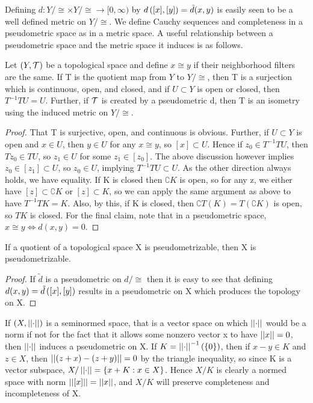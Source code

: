 




 
  Defining $d:Y/\cong \times Y/\cong \to [0,\infty)$ by $d\left( [x],[y]\right) = \tilde{d}(x,y)$ is easily seen to be a well defined metric on $Y/\cong$. We define Cauchy sequences and completeness in a pseudometric space as in a metric space. A useful relationship between a pseudometric space and the metric space it induces is as follows. 
\begin{prop}
    \label{prop:pseudometricembedding}
    Let $(Y,\mathcal{T})$ be a topological space and define $x \cong y$ if their neighborhood filters are the same. If T is the quotient map from $Y$ to $Y/\cong$, then T is a surjection which is continuous, open, and closed, and if $U \subset Y$ is open or closed, then $T^{-1} T U = U$. 
    Further, if $\mathcal{T}$ is created by a pseudometric d, then T is an isometry using the induced metric on $Y/\cong$.
    \begin{proof}
        That T is surjective, open, and continuous is obvious. Further, if $U \subset Y$ is open and $x \in U$, then $y \in U$ for any $x \cong y$, so $[x] \subset U$. Hence if $z_0 \in T^{-1} T U$, then $Tz_0 \in TU$, so $z_1 \in U$ for some $z_1 \in [z_0]$. The above discussion however implies $z_0 \in [z_1] \subset U$, so $z_0 \in U$, implying $T^{-1}T U \subset U$. As the other direction always holds, we have equality. 
        If K is closed then $\complement K$ is open, so for any z, we either have $[z] \subset \complement K$ or $[z] \subset K$, so we can apply the same argument as above to have $T^{-1}TK =K$. 
        Also, by this, if K is closed, then $\complement T(K) = T(\complement K)$ is open, so $TK$ is closed. 
        For the final claim, note that in a pseudometric space, $x \cong y \iff d(x,y) = 0$. 
    \end{proof} 
\end{prop} 


\begin{prop}
    \label{prop:pseudometrizableprequotient}
    If a quotient of a topological space X is pseudometrizable, then X is pseudometrizable.
    \begin{proof}
        If $\tilde{d}$ is a pseudometric on $d/\cong$ then it is easy to see that defining $d(x,y)=\tilde{d}\left( [x],[y]\right)$ results in a pseudometric on X which produces the topology on X. 
    \end{proof} 
\end{prop} 
If $(X,\left|\left| \cdot \right|\right|)$ is a seminormed space, that is a vector space on which $\left|\left| \cdot \right|\right|$ would be a norm if not for the fact that it allows some nonzero vector x to have $\left|\left| x \right|\right|=0$, then $\left|\left| \cdot \right|\right|$ induces a pseudometric on X. 
If $K=\left|\left| \cdot \right|\right|^{-1}(\{0\})$, then if $x-y \in K$ and $z \in X$, then $\left|\left| (z+x)-(z+y) \right|\right|=0$ by the triangle inequality, so since K is a vector subspace, $X/\left|\left| \cdot \right|\right|=\{x+K: x \in X\}$.
Hence $X/K$ is clearly a normed space with norm $\left|\left| [x] \right|\right| = \left|\left| x \right|\right|$, and $X/K$ will preserve completeness and incompleteness of X. 

